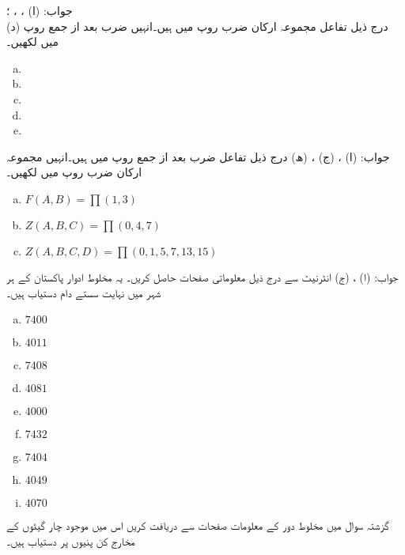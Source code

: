جواب: (ا) ، ، ؛  \\
(د) 
درج ذیل تفاعل مجموعہ ارکان ضرب  روپ میں ہیں۔انہیں  ضرب بعد از جمع روپ میں لکھیں۔
\begin{multicols}{2}
\begin{enumerate}[a.]
\item
\item
\item
\item
\item
\end{enumerate}
\end{multicols}

جواب:  (ا) ، (ج) ،  (ھ) 
درج ذیل تفاعل  ضرب بعد از جمع  روپ میں ہیں۔انہیں مجموعہ ارکان ضرب روپ میں لکھیں۔
\begin{multicols}{2}
\begin{enumerate}[a.]
\item
\( F(A,B)=\prod (1,3)\)
\item
\( Z(A,B,C)=\prod (0,4,7) \)
\item
\( Z(A,B,C,D)=\prod (0,1,5,7,13,15) \)
\end{enumerate}
\end{multicols}

جواب: (ا) ، (ج) 
انٹرنیٹ  سے درج ذیل معلوماتی صفحات  حاصل کریں۔ یہ مخلوط ادوار پاکستان کے ہر شہر میں نہایت سستے دام  دستیاب ہیں۔
\begin{multicols}{5}
\begin{enumerate}[a.]
\item
 \( 7400 \) 
 \item
  \( 4011  \)
  \item
  \( 7408  \)
  \item
  \(  4081  \)
  \item
  \( 4000  \)
  \item
  \( 7432  \)
  \item
  \( 7404  \)
  \item
  \( 4049  \)
  \item
  \( 4070  \)
\end{enumerate}
\end{multicols}
گزشتہ سوال میں  مخلوط دور  کے  معلومات صفحات سے   دریافت کریں اس میں موجود  چار گیٹوں کے مخارج کن پنیوں پر دستیاب ہیں۔

